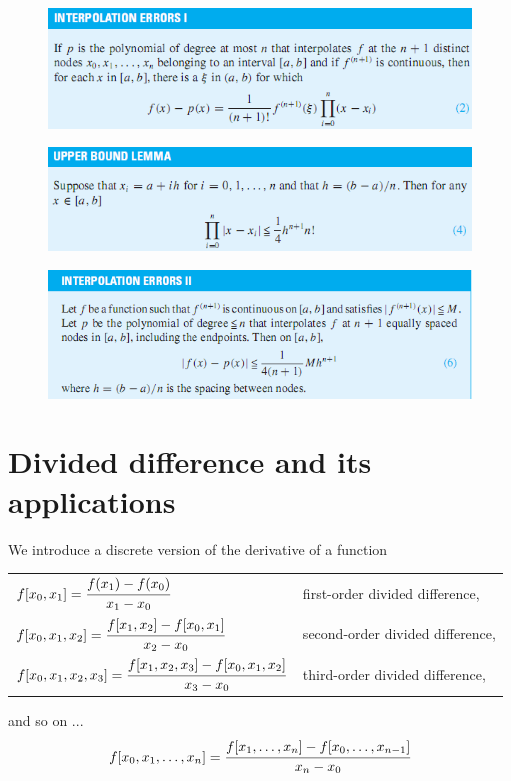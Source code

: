 \documentclass[12pt]{article}
\theoremstyle{theorem}
\begin{document}
\begin{figure}[h!]
	\centering
	\includegraphics[scale = 0.9]{Figures/16}
\end{figure}

\begin{figure}[h!]
	\centering
	\includegraphics[scale = 0.9]{Figures/17}
\end{figure}

\begin{figure}[!h]
	\centering
	\includegraphics[scale = 0.9]{Figures/18}
\end{figure}


\section{Divided difference and its applications}

We introduce a discrete version of the derivative of a function 

\begin{shaded}
\begin{tabular}[2]{ll}
$f[x_0,x_1] = \cfrac{f(x_1)-f(x_0)}{x_1 - x_0}$ & first-order divided difference, \\[.3cm]
$f[x_0,x_1,x_2] = \cfrac{f[x_1,x_2]-f[x_0,x_1]}{x_2 - x_0}$ & second-order divided difference, \\[.3cm]
$f[x_0,x_1,x_2,x_3] = \cfrac{f[x_1,x_2,x_3]-f[x_0,x_1,x_2]}{x_3 - x_0}$ & third-order divided difference,\\
\end{tabular}

and so on ...
%
\[ 
f[x_0,x_1,\dots,x_n] = \cfrac{f[x_1,\dots,x_n]-f[x_0,\dots,x_{n-1}]}{x_n - x_0}
\]
%
\end{shaded}
\end{document}
